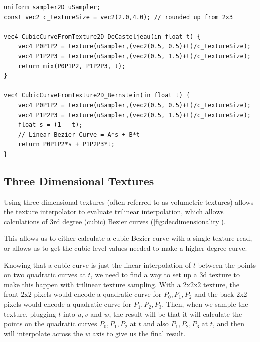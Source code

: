 \documentclass{jcgt}
\begin{document}
\begin{lstlisting}[caption={GLSL for evaluating a cubic curve encoded in a $(2,4)$ pixel 2d texture.  Bilinear texture sampling used to evaluate the first two levels of the De Casteljeau algorithm, then the process is continued both with the De Casteljeau algorithm, as well as the Bernstein form of a linear Bezier curve (lerp).}, label={lst:GLSLCubicTexture2D}]
uniform sampler2D uSampler; 
const vec2 c_textureSize = vec2(2.0,4.0); // rounded up from 2x3

vec4 CubicCurveFromTexture2D_DeCasteljeau(in float t) {
    vec4 P0P1P2 = texture(uSampler,(vec2(0.5, 0.5)+t)/c_textureSize);
    vec4 P1P2P3 = texture(uSampler,(vec2(0.5, 1.5)+t)/c_textureSize);
    return mix(P0P1P2, P1P2P3, t);
}

vec4 CubicCurveFromTexture2D_Bernstein(in float t) {
    vec4 P0P1P2 = texture(uSampler,(vec2(0.5, 0.5)+t)/c_textureSize);
    vec4 P1P2P3 = texture(uSampler,(vec2(0.5, 1.5)+t)/c_textureSize);
    float s = (1 - t);
    // Linear Bezier Curve = A*s + B*t
    return P0P1P2*s + P1P2P3*t;
}
\end{lstlisting}

\subsection{Three Dimensional Textures}

Using three dimensional textures (often referred to as volumetric textures) allows the texture interpolator to evaluate trilinear interpolation, which allows calculations of 3rd degree (cubic) Bezier curves (\autoref{fig:decdimensionality}).

This allows us to either calculate a cubic Bezier curve with a single texture read, or allows us to get the cubic level values needed to make a higher degree curve.

Knowing that a cubic curve is just the linear interpolation of $t$ between the points on two quadratic curves at $t$, we need to find a way to set up a 3d texture to make this happen with trilinear texture sampling.  With a $2$x$2$x$2$ texture, the front $2$x$2$ pixels would encode a quadratic curve for $P_0,P_1,P_2$ and the back $2$x$2$ pixels would encode a quadratic curve for $P_1,P_2,P_3$.  Then, when we sample the texture, plugging $t$ into $u,v$ and $w$, the result will be that it will calculate the points on the quadratic curves $P_0,P_1,P_2$ at $t$ and also $P_1,P_2,P_3$ at $t$, and then will interpolate across the $w$ axis to give us the final result.
\end{document}
